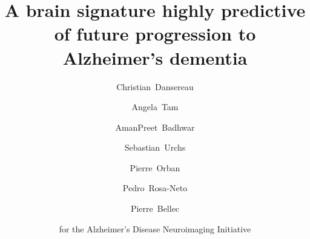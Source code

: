 \documentclass[authoryear]{elsarticle}
\begin{document}
\begin{frontmatter}
\title{A brain signature highly predictive of future progression to Alzheimer's dementia}

\author[a,b]{Christian~Dansereau}
\author[c]{Angela~Tam}
\author[a]{AmanPreet~Badhwar}
\author[c]{Sebastian~Urchs}
\author[a,e,f]{Pierre~Orban}
\author[d]{Pedro~Rosa-Neto}
\author[a,b]{Pierre~Bellec}
\author{for the Alzheimer's Disease Neuroimaging Initiative}



\address[a]{Centre de Recherche de l'Institut Universitaire de G\'eriatrie de Montr\'eal, Montr\'eal, CA}
\address[b]{D\'epartement d'Informatique et de recherche op\'erationnelle, Universit\'e de Montr\'eal, Montr\'eal,CA}
\address[c]{Integrated Program in Neuroscience, McGill University, Montr\'eal,CA}
\address[d]{Douglas Mental Health institute, McGill University, Montr\'eal,CA}
\address[e]{Centre de Recherche de l'Institut Universitaire en Sant\'e Mentale de Montr\'eal, Montr\'eal, CA}
\address[f]{D\'epartement de Psychiatrie, Universit\'e de Montr\'eal, Montr\'eal, CA}

%


\end{frontmatter}
\end{document}
